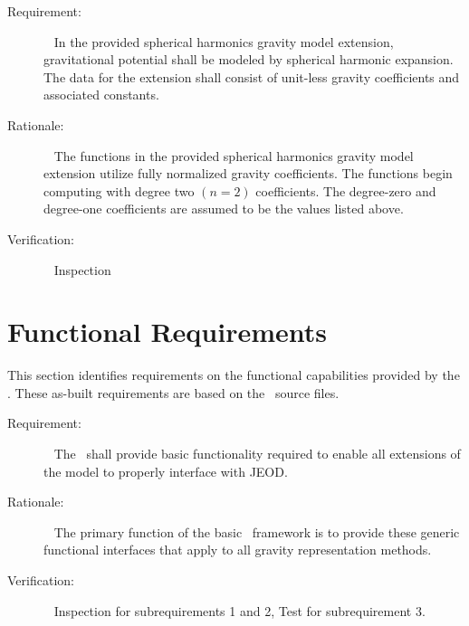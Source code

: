 \label{reqt:spherharm_data}
\begin{description}
  \item[Requirement:]\ \newline
In the provided spherical harmonics gravity model extension, gravitational
potential shall be modeled by spherical harmonic expansion. The data for
the extension shall consist of unit-less gravity coefficients and
associated constants.
  \item[Rationale:]\ \newline
The functions in the provided spherical harmonics gravity model extension
utilize fully normalized gravity coefficients. The functions begin computing
with degree two $(n=2)$ coefficients.  The degree-zero and degree-one
coefficients are assumed to be the values listed above.
  \item[Verification:]\ \newline
Inspection
\end{description}

\section{Functional Requirements}\label{sec:func_reqts}
This section identifies requirements on the functional 
capabilities provided by the \ModelDesc.  These as-built requirements are
based on the \ModelDesc\ source files.

\label{reqt:generic_func}
\begin{description}
  \item[Requirement:]\ \newline
The \ModelDesc\ shall provide basic functionality required to enable all
extensions of the model to properly interface with JEOD.
  \item[Rationale:]\ \newline
The primary function of the basic \ModelDesc\ framework is to provide
these generic functional interfaces that apply to all gravity representation
methods.
  \item[Verification:]\ \newline
Inspection for subrequirements 1 and 2, Test for subrequirement 3.
\end{description}

